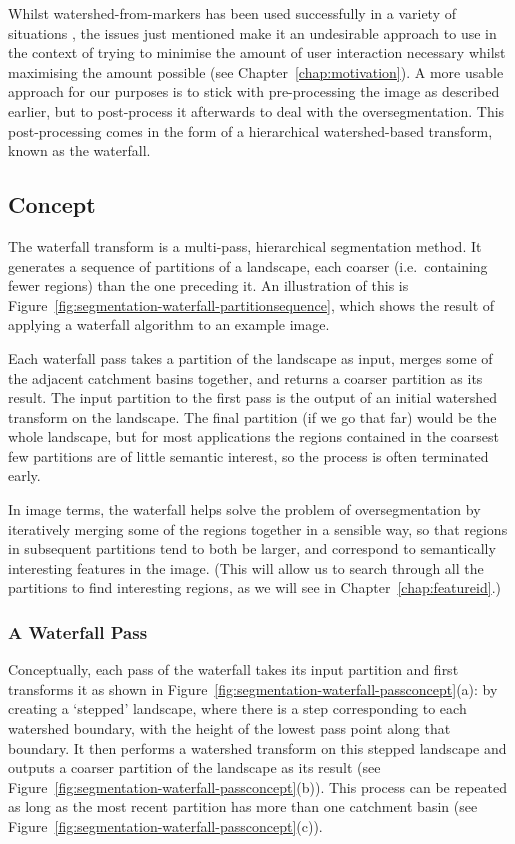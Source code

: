 Whilst watershed-from-markers has been used successfully in a variety of situations \cite{?}, the issues just mentioned make it an undesirable approach to use in the context of trying to minimise the amount of user interaction necessary whilst maximising the amount possible (see Chapter~\ref{chap:motivation}). A more usable approach for our purposes is to stick with pre-processing the image as described earlier, but to post-process it afterwards to deal with the oversegmentation. This post-processing comes in the form of a hierarchical watershed-based transform, known as the waterfall.

\subsection{Concept}

The waterfall transform is a multi-pass, hierarchical segmentation method. It generates a sequence of partitions of a landscape, each coarser (i.e.~containing fewer regions) than the one preceding it. An illustration of this is Figure~\ref{fig:segmentation-waterfall-partitionsequence}, which shows the result of applying a waterfall algorithm to an example image.


Each waterfall pass takes a partition of the landscape as input, merges some of the adjacent catchment basins together, and returns a coarser partition as its result. The input partition to the first pass is the output of an initial watershed transform on the landscape. The final partition (if we go that far) would be the whole landscape, but for most applications the regions contained in the coarsest few partitions are of little semantic interest, so the process is often terminated early.

In image terms, the waterfall helps solve the problem of oversegmentation by iteratively merging some of the regions together in a sensible way, so that regions in subsequent partitions tend to both be larger, and correspond to semantically interesting features in the image. (This will allow us to search through all the partitions to find interesting regions, as we will see in Chapter~\ref{chap:featureid}.)

\subsubsection{A Waterfall Pass}

Conceptually, each pass of the waterfall takes its input partition and first transforms it as shown in Figure~\ref{fig:segmentation-waterfall-passconcept}(a): by creating a `stepped' landscape, where there is a step corresponding to each watershed boundary, with the height of the lowest pass point along that boundary. It then performs a watershed transform on this stepped landscape and outputs a coarser partition of the landscape as its result (see Figure~\ref{fig:segmentation-waterfall-passconcept}(b)). This process can be repeated as long as the most recent partition has more than one catchment basin (see Figure~\ref{fig:segmentation-waterfall-passconcept}(c)).

